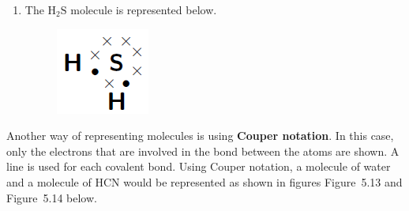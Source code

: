 {\begin{mdframed}[linewidth=4, leftmargin=40, rightmargin=40]
\begin{exercise}
\begin{enumerate}[noitemsep, label=\textbf{Step} \textbf{\arabic*}. ]
\begin{figure}[H]
\begin{center}
      \vspace{2pt}
    \vspace{.1in}
    
    \end{center}

 \end{figure}   

    \addtocounter{footnote}{-0}
    
      \item  
      \label{m38701*id140712}The \begin{math}\mathrm{H}{}_{2}\mathrm{S}\end{math} molecule is represented below.\par 
      
    \setcounter{subfigure}{0}


	\begin{figure}[H] %
    \begin{center}
    \label{m38701*uid20!!!underscore!!!media}\label{m38701*uid20!!!underscore!!!printimage}\includegraphics{col11305.imgs/m38701_CG11C1_014.png} %
        
      \vspace{2pt}
    \vspace{.1in}
    
    \end{center}

 \end{figure}   

    \addtocounter{footnote}{-0}
    
\end{enumerate}
         

    \end{exercise}
    \end{mdframed}
    }
    \noindent
  
      \label{m38701*id140737}Another way of representing molecules is using \textbf{Couper notation}. In this case, only the electrons that are involved in the bond between the atoms are shown. A line is used for each covalent bond. Using Couper notation, a molecule of water and a molecule of \begin{math}\mathrm{HCN}\end{math} would be represented as shown in figures Figure~5.13 and Figure~5.14 below.\par 
      
